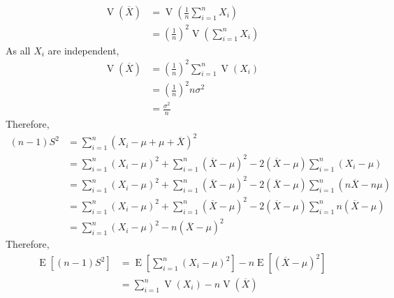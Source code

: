 \documentclass[titlepage, fleqn, a4paper, 12pt, twoside]{article}
\theoremstyle{definition}
\theoremstyle{theorem}
\DeclareMathOperator{\expct}{\mathrm{E}}
\DeclareMathOperator{\var}{\mathrm{V}}
\begin{document}
\begin{solution}
	\begin{align*}
		\var\left( \overline{X} \right) & = \var\left( \frac{1}{n} \sum\limits_{i = 1}^{n} X_i \right) \\
                                                & = \left( \frac{1}{n} \right)^2 \var\left( \sum\limits_{i = 1}^{n} X_i \right)
	\end{align*}
	As all $X_i$ are independent,
	\begin{align*}
		\var\left( \overline{X} \right) & = \left( \frac{1}{n} \right)^2 \sum\limits_{i = 1}^{n} \var(X_i) \\
                                                & = \left( \frac{1}{n} \right)^2 n \sigma^2                        \\
                                                & = \frac{\sigma^2}{n}
	\end{align*}
	Therefore,
	\begin{align*}
		(n - 1) S^2 & = \sum\limits_{i = 1}^{n} \left( X_i - \mu + \mu + \overline{X} \right)^2                                                                                                                                 \\
                            & = \sum\limits_{i = 1}^{n} (X_i - \mu)^2 + \sum\limits_{i = 1}^{n} \left( \overline{X} - \mu \right)^2 - 2 \left( \overline{X} - \mu \right) \sum\limits_{i = 1}^{n} (X_i - \mu)                           \\
                            & = \sum\limits_{i = 1}^{n} (X_i - \mu)^2 + \sum\limits_{i = 1}^{n} \left( \overline{X} - \mu \right)^2 - 2 \left( \overline{X} - \mu \right) \sum\limits_{i = 1}^{n} \left( n \overline{X} - n \mu \right) \\
                            & = \sum\limits_{i = 1}^{n} (X_i - \mu)^2 + \sum\limits_{i = 1}^{n} \left( \overline{X} - \mu \right)^2 - 2 \left( \overline{X} - \mu \right) \sum\limits_{i = 1}^{n} n \left( \overline{X} - \mu \right)   \\
                            & = \sum\limits_{i = 1}^{n} (X_i - \mu)^2 - n \left( \overline{X} - \mu \right)^2
	\end{align*}
	Therefore,
	\begin{align*}
		\expct\left[ (n - 1) S^2 \right] & = \expct\left[ \sum\limits_{i = 1}^{n} (X_i - \mu)^2 \right] - n \expct\left[ \left( \overline{X} - \mu \right)^2 \right] \\
                                                 & = \sum\limits_{i = 1}^{n} \var(X_i) - n \var\left( \overline{X} \right)                                                   \\

\end{align*}
\end{solution}
\end{document}
